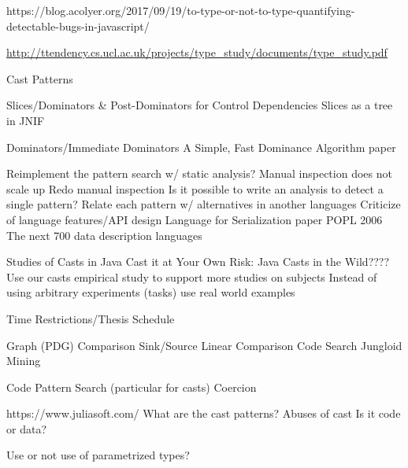 https://blog.acolyer.org/2017/09/19/to-type-or-not-to-type-quantifying-detectable-bugs-in-javascript/

\url{http://ttendency.cs.ucl.ac.uk/projects/type_study/documents/type_study.pdf}


Cast Patterns

Slices/Dominators \& Post-Dominators for Control Dependencies
Slices as a tree in JNIF


Dominators/Immediate Dominators
A Simple, Fast Dominance Algorithm paper


Reimplement the pattern search w/ static analysis?
Manual inspection does not scale up
Redo manual inspection
Is it possible to write an analysis to detect a single pattern?
Relate each pattern w/ alternatives in another languages
Criticize of language features/API design
Language for Serialization paper POPL 2006
The next 700 data description languages


Studies of Casts in Java
Cast it at Your Own Risk: Java Casts in the Wild????
Use our casts empirical study to support more studies on subjects
Instead of using arbitrary experiments (tasks) use real world examples


Time Restrictions/Thesis Schedule

Graph (PDG) Comparison
Sink/Source
Linear Comparison
Code Search
Jungloid Mining

Code Pattern Search (particular for casts)
Coercion

https://www.juliasoft.com/
What are the cast patterns?
Abuses of cast
Is it code or data?

Use or not use of parametrized types?